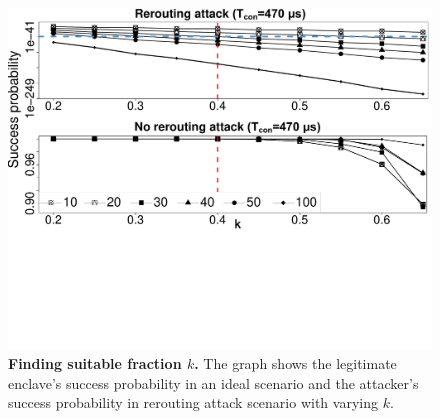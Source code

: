 \newcommand{\roundCompCaption}{\textbf{Finding suitable fraction $k$.} The graph shows the legitimate enclave's success probability in an ideal scenario and the attacker's success probability in rerouting attack scenario with varying $k$.}

\newcommand{\mainResultCaption}{\textbf{\name result in distinguishing rerouting attack.} The graph shows the attacker's success probability $P_{adv}$ and the legitimate success probability $P_{legit}$ in proximity verification for different number of rounds ($n$) given a fixed $k=0.4$.}%

\ifusenix
\begin{figure}[t]
  \centering
    \includegraphics[trim={0 10cm 0 0}, clip, width=\linewidth]{data/graph/round_comp_new.pdf}
    \caption{\roundCompCaption}
    \label{graph:roundSuccess}
\end{figure}

